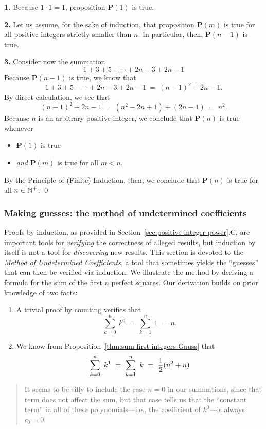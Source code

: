 {\bf 1.} Because $1 \cdot 1 = 1$, proposition {\bf P}$(1)$ is true.

{\bf 2.} Let us assume, for the sake of induction, that proposition
{\bf P}$(m)$ is true for all positive integers strictly smaller than
$n$.  In particular, then, {\bf P}$(n-1)$ is true.

{\bf 3.} Consider now the summation
\[ 1 + 3 + 5 + \cdots + 2n-3 + 2n-1 \]
Because {\bf P}$(n-1)$ is true, we know that
\[ 1 + 3 + 5 + \cdots + 2n-3 + 2n-1 \ = \ (n-1)^2 + 2n-1.  \]
By direct calculation, we see that
\[ (n-1)^2 + 2n-1 \ = \ (n^2 -2n +1) + (2n-1) \ = \ n^2. \]
Because $n$ is an arbitrary positive integer, we conclude that
{\bf P}$(n)$ is true whenever
\begin{itemize}
\item
{\bf P}$(1)$ is true
\item
{\em and}
{\bf P}$(m)$ is true for all $m < n$.
\end{itemize}
By the Principle of (Finite) Induction, then, we conclude that {\bf
  P}$(n)$ is true for all $n \in \mathbb{N}^+$.
\qed



\subsubsection{Making guesses: the method of undetermined coefficients}
\label{sec:undetermined-coefficients1}

Proofs by induction, as provided in
Section~\ref{sec:positive-integer-power}.C, are important tools for
{\em verifying} the correctness of alleged results, but induction by
itself is not a tool for {\em discovering} new results.  This section
is devoted to the {\em Method of Undetermined Coefficients}, a tool
that sometimes yields the ``guesses'' that can then be verified via
induction.  We illustrate the method by deriving a formula for the sum
of the first $n$ perfect squares.  Our derivation builds on prior
knowledge of two facts:
\begin{enumerate}
\item
A trivial proof by counting verifies that
\[ \sum_{k=0}^n \ k^0 \ = \ \sum_{k=1}^n \ 1 \ = \ n.  \]
\item
We know from Proposition~\ref{thm:sum-first-integers-Gauss} that
\[
\sum_{k=0}^n \ k^1 \ = \ \sum_{k=1}^n \ k \ = \ {1 \over 2}(n^2 + n)
\]
\end{enumerate}
\begin{quote}
It seems to be silly to include the case $n=0$ in our summations,
since that term does not affect the sum, but that case tells us that
the ``constant term'' in all of these polynomials---i.e., the
coefficient of $k^0$---is always $c_0 =0$.
\end{quote}

